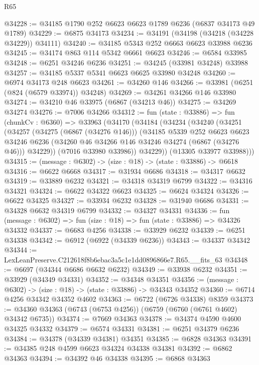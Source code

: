 \begin{lexlean}{R65}
\begin{coremodule}
{@34228 := @34185 @1790 @252 @6623 @6623 @1789 @6236 (@6837 @34173 @49 @1789)
@34229 := @6875 @34173
@34234 := @34191 (@34198 (@34218 (@34228 @34229)) @34111)
@34240 := @34185 @5343 @252 @6663 @6623 @33988 @6236
@34245 := @34174 @863 @114 @5342 @6661 @6623
@34246 := @6584 @33985
@34248 := @6251 @34246 @6236
@34251 := @34245 (@33981 @34248) @33988
@34257 := @34185 @5337 @5341 @6623 @6625 @33980 @34248
@34260 := @6974 @34173 @248 @6623
@34261 := @34260 @146
@34266 := @33981 (@6251 (@824 (@6579 @33974)) @34248)
@34269 := @34261 @34266 @146 @33980
@34274 := @34210 @46 @33975 (@6867 (@34213 @46))
@34275 := @34269 @34274
@34276 := @7006 @34266
@34312 := fun (state : @33886) =>
  fun (chunkCv : @6360) =>
  @33963
    (@34170
      (@34184
        (@34234
          (@34240
            (@34251
              (@34257
                (@34275 (@6867 (@34276 @146)))
                (@34185
                  @5339
                  @252
                  @6623
                  @6623
                  @34246
                  @6236
                  (@34260 @46 @34266 @146 @34246 @34274 (@6867 (@34276 @46)))
                  @34229))
              (@7016 @33980 @33986))
            @34229))
        (@13305 @33977 @33988)))
@34315 := (message : @6302) -> (size : @18) -> (state : @33886) -> @6618
@34316 := @6622 @6668
@34317 := @31934 @6686
@34318 := @34317 @6632
@34319 := @33889 @6232
@34321 := @34318 @34319 @6799
@34322 := @34316 @34321
@34324 := @6622 @34322 @6623
@34325 := @6624 @34324
@34326 := @6622 @34325
@34327 := @33934 @6232
@34328 := @31940 @6686
@34331 := @34328 @6632 @34319 @6799
@34332 := @34327 @34331
@34336 := fun (message : @6302) => fun (size : @18) => fun (state : @33886) => @34326 @34332
@34337 := @6683 @4256
@34338 := @33929 @6232
@34339 := @6251 @34338
@34342 := @6912 (@6922 (@34339 @6236))
@34343 := @34337 @34342
@34344 := LexLeanPreserve.C212618f8b6ebac3a5c1e1dd0896866e7.R65.__fits_63
@34348 := @6697 (@34344 @6686 @6632 @6232)
@34349 := @33938 @6232
@34351 := @33929 (@34349 @34331)
@34352 := @34348 @34351
@34356 := (message : @6302) -> (size : @18) -> (state : @33886) -> @34343 @34352
@34360 := @6714 @4256 @34342 @34352 @4602
@34363 := @6722 (@6726 @34338) @8359
@34373 := @34360 @34363 (@6743 (@6753 @4256)) (@6759 (@6760 (@6761 @4602) @34342 @6735))
@34374 := @7669 @34363
@34378 := @34374 @4590 @4600 @34325 @34332
@34379 := @6574 @34331
@34381 := @6251 @34379 @6236
@34384 := @34378 (@34339 @34381) @34351
@34385 := @6828 @34363
@34391 := @34385 @248 @4599 @6623 @34324 @34338 @34381
@34392 := @6862 @34363
@34394 := @34392 @46 @34338
@34395 := @6868 @34363
}
\end{coremodule}
\end{lexlean}
